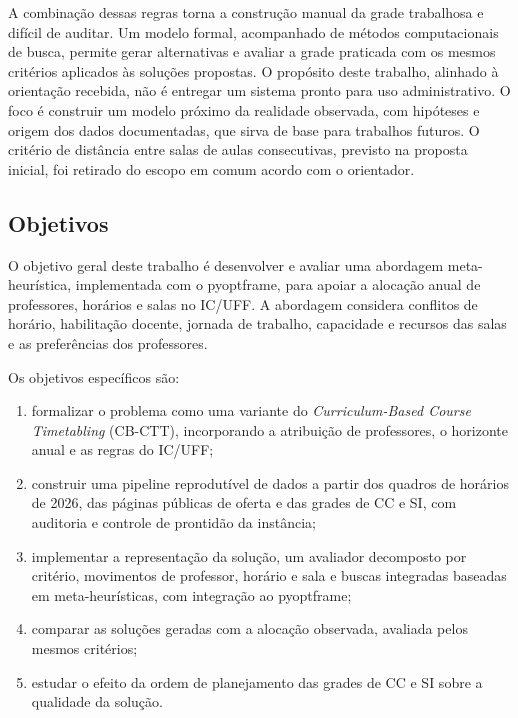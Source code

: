 A combinação dessas regras torna a construção manual da grade trabalhosa e difícil de auditar. Um modelo formal, acompanhado de métodos computacionais de busca, permite gerar alternativas e avaliar a grade praticada com os mesmos critérios aplicados às soluções propostas. O propósito deste trabalho, alinhado à orientação recebida, não é entregar um sistema pronto para uso administrativo. O foco é construir um modelo próximo da realidade observada, com hipóteses e origem dos dados documentadas, que sirva de base para trabalhos futuros. O critério de distância entre salas de aulas consecutivas, previsto na proposta inicial, foi retirado do escopo em comum acordo com o orientador.

\subsection{Objetivos}
\label{subsec:objetivos}

O objetivo geral deste trabalho é desenvolver e avaliar uma abordagem meta-heurística, implementada com o pyoptframe, para apoiar a alocação anual de professores, horários e salas no IC/UFF. A abordagem considera conflitos de horário, habilitação docente, jornada de trabalho, capacidade e recursos das salas e as preferências dos professores.

Os objetivos específicos são:
\begin{enumerate}
  \item formalizar o problema como uma variante do \textit{Curriculum-Based Course Timetabling} (CB-CTT), incorporando a atribuição de professores, o horizonte anual e as regras do IC/UFF;
  \item construir uma pipeline reprodutível de dados a partir dos quadros de horários de 2026, das páginas públicas de oferta e das grades de CC e SI, com auditoria e controle de prontidão da instância;
  \item implementar a representação da solução, um avaliador decomposto por critério, movimentos de professor, horário e sala e buscas integradas baseadas em meta-heurísticas, com integração ao pyoptframe;
  \item comparar as soluções geradas com a alocação observada, avaliada pelos mesmos critérios;
  \item estudar o efeito da ordem de planejamento das grades de CC e SI sobre a qualidade da solução. 
\end{enumerate}

